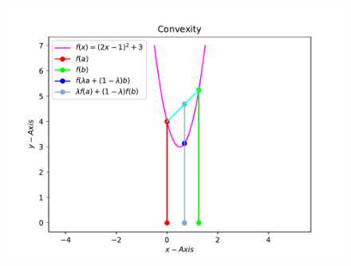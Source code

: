 \documentclass[12pt]{article}
\begin{document}
\begin{enumerate}
\begin{figure}[!h]
\begin{center}
		\includegraphics[width=\columnwidth]{./figs/problem1.pdf}
	\end{center}
\caption{}
\label{fig:Fig1}
\end{figure}
\end{enumerate}
\end{document}
